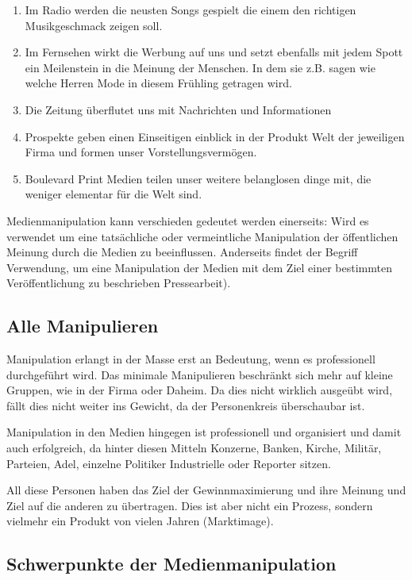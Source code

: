 \begin{enumerate}
	\item Im Radio werden die neusten Songs gespielt die einem den richtigen Musikgeschmack zeigen
soll.
	\item Im Fernsehen wirkt die Werbung auf uns und setzt ebenfalls mit jedem Spott ein Meilenstein
in die Meinung der Menschen. In dem sie z.B. sagen wie welche Herren Mode in diesem Frühling getragen
wird.
	\item Die Zeitung überflutet uns mit Nachrichten und Informationen
	\item Prospekte geben einen Einseitigen einblick in der Produkt Welt der jeweiligen Firma und
formen unser Vorstellungsvermögen.
	\item Boulevard Print Medien teilen unser weitere belanglosen dinge mit, die weniger elementar
für die Welt sind.
\end{enumerate}

Medienmanipulation kann verschieden gedeutet werden einerseits:
Wird es verwendet um eine tatsächliche oder vermeintliche Manipulation der öffentlichen Meinung durch
die Medien zu beeinflussen.
Anderseits findet der Begriff Verwendung, um eine Manipulation der Medien mit dem Ziel einer
bestimmten Veröffentlichung zu beschrieben  Pressearbeit).

\subsection{Alle Manipulieren}
Manipulation erlangt in der Masse erst an Bedeutung, wenn es professionell durchgeführt wird. Das
minimale Manipulieren beschränkt sich mehr auf kleine Gruppen, wie in der Firma oder Daheim. Da dies
nicht wirklich ausgeübt wird, fällt dies nicht weiter ins Gewicht, da der Personenkreis überschaubar
ist.

Manipulation in den Medien hingegen ist professionell und organisiert und damit auch erfolgreich, da
hinter diesen Mitteln Konzerne, Banken, Kirche, Militär, Parteien, Adel, einzelne Politiker
Industrielle oder Reporter sitzen.

All diese Personen haben das Ziel der Gewinnmaximierung und ihre Meinung und Ziel auf die anderen zu
übertragen. Dies ist aber nicht ein Prozess, sondern vielmehr ein Produkt von vielen Jahren
(Marktimage).


\subsection{Schwerpunkte der Medienmanipulation}

